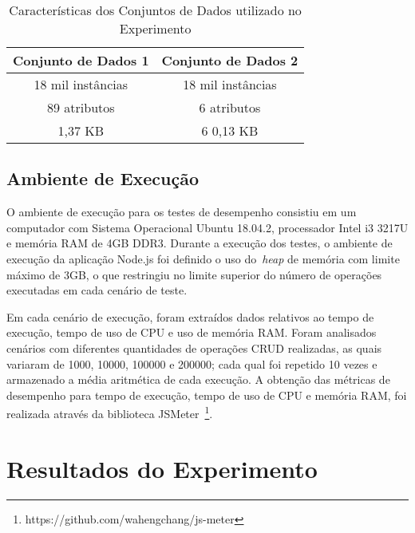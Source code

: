 \documentclass[12pt]{article}
\begin{document}
\begin{table}[ht]
\centering
\caption{Características dos Conjuntos de Dados utilizado no Experimento}
\label{tab:conjunto-dados}
\begin{tabular}{|c|c|}
\hline
\textbf{Conjunto de Dados 1} & \textbf{Conjunto de Dados 2} \\ \hline
18 mil instâncias   		 & 18 mil instâncias            \\ \hline
89 atributos        		 & 6 atributos                  \\ \hline
1,37 KB        				 & 6 0,13 KB                    \\ \hline
\end{tabular}
\end{table}

\subsection{Ambiente de Execução}

O ambiente de execução para os testes de desempenho consistiu em um computador com Sistema Operacional Ubuntu 18.04.2, processador Intel i3 3217U e memória RAM de 4GB DDR3. Durante a execução dos testes, o ambiente de execução da aplicação Node.js foi definido o uso do~\emph{heap} de memória com limite máximo de 3GB, o que restringiu no limite superior do número de operações executadas em cada cenário de teste.

Em cada cenário de execução, foram extraídos dados relativos ao tempo de execução, tempo de uso de CPU e uso de memória RAM. Foram analisados cenários com diferentes quantidades de operações CRUD realizadas, as quais variaram de 1000, 10000, 100000 e 200000; cada qual foi repetido 10 vezes e armazenado a média aritmética de cada execução. A obtenção das métricas de desempenho para tempo de execução, tempo de uso de CPU e memória RAM, foi realizada através da biblioteca JSMeter~\footnote{https://github.com/wahengchang/js-meter}. 

\section{Resultados do Experimento}
\label{section:resultados}

\end{document}

